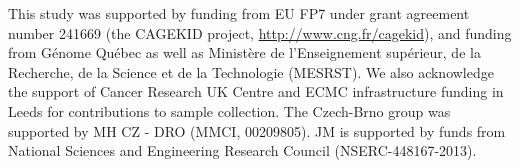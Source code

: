 This study was supported by funding from EU FP7 under grant agreement number 241669 (the CAGEKID project, \href{cagekid}{http://www.cng.fr/cagekid}), and funding from Génome Québec as well as Ministère de l'Enseignement supérieur, de la Recherche, de la Science et de la Technologie (MESRST).
We also acknowledge the support of Cancer Research UK Centre and ECMC infrastructure funding in Leeds for contributions to sample collection.
The Czech-Brno group was supported by MH CZ - DRO (MMCI, 00209805).
JM is supported by funds from National Sciences and Engineering Research Council (NSERC-448167-2013).



